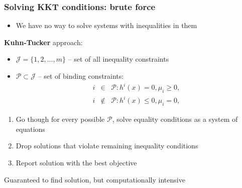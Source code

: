 \documentclass[bigger]{beamer}
\begin{document}
\begin{frame}%
\frametitle{Solving KKT conditions: brute force}

\begin{itemize}
\item We have no way to solve systems with inequalities in them
\end{itemize}

\textbf{Kuhn-Tucker} approach:

\begin{itemize}
\item $\mathcal{J}=\{1,2,...,m\}$ -- set of all inequality constraints

\item $\mathcal{P\subset J}$ -- set of binding constraints:%
\begin{eqnarray*}
i &\in &\mathcal{P}:h^{i}(x)=0,\mu _{i}\geq 0, \\
i &\not\in &\mathcal{P}:h^{i}(x)\leq 0,\mu _{i}=0,
\end{eqnarray*}
\end{itemize}

\begin{enumerate}
\item Go though for every possible $\mathcal{P}$, \newline
solve equality conditions as a system of equations

\item Drop solutions that violate remaining inequality conditions

\item Report solution with the best objective
\end{enumerate}

Guaranteed to find solution, but computationally intensive


\end{frame}%
\end{document}
